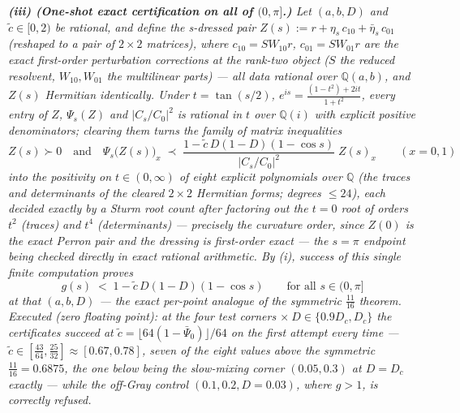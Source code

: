 \documentclass[
]{article}
\begin{document}
\emph{\textbf{(iii) (One-shot exact certification on all of $(0,\pi]$.)} Let
$(a,b,D)$ and $\tilde c\in[0,2)$ be rational, and define the \emph{s-dressed
pair} $Z(s):=r+\eta_s\,c_{10}+\bar\eta_s\,c_{01}$ (reshaped to a pair of
$2\times2$ matrices), where $c_{10}=SW_{10}r$, $c_{01}=SW_{01}r$ are the
exact first-order perturbation corrections at the rank-two object ($S$ the
reduced resolvent, $W_{10},W_{01}$ the multilinear parts) --- all data
rational over $\mathbb Q(a,b)$, and $Z(s)$ Hermitian identically. Under
$t=\tan(s/2)$, $e^{is}=\frac{(1-t^2)+2it}{1+t^2}$, every entry of $Z$,
$\Psi_s(Z)$ and $|C_s/C_0|^2$ is rational in $t$ over $\mathbb Q(i)$ with
explicit positive denominators; clearing them turns the family of matrix
inequalities}
\[
  Z(s)\succ0\quad\text{and}\quad
  \Psi_s\bigl(Z(s)\bigr)_x\;\prec\;
  \frac{1-\tilde c\,D(1-D)(1-\cos s)}{|C_s/C_0|^2}\;Z(s)_x\qquad(x=0,1)
\]
\emph{into the positivity on $t\in(0,\infty)$ of \emph{eight explicit
polynomials} over $\mathbb Q$ (the traces and determinants of the cleared
$2\times2$ Hermitian forms; degrees $\le24$), each decided exactly by a
Sturm root count after factoring out the $t=0$ root of orders $t^2$
(traces) and $t^4$ (determinants) --- precisely the curvature order, since
$Z(0)$ is the exact Perron pair and the dressing is first-order exact ---
the $s=\pi$ endpoint being checked directly in exact rational arithmetic.
By (i), success of this single finite computation \emph{proves}}
\[
  g(s)\;<\;1-\tilde c\,D(1-D)(1-\cos s)\qquad\text{for all }s\in(0,\pi]
\]
\emph{at that $(a,b,D)$ --- the exact per-point analogue of the symmetric
$\tfrac{11}{16}$ theorem. Executed (zero floating point): at the four test
corners $\times\ D\in\{0.9D_c,D_c\}$ the certificates succeed at
$\tilde c=\lfloor64(1-\bar\Psi_0)\rfloor/64$ on the first attempt every
time --- $\tilde c\in[\tfrac{43}{64},\tfrac{25}{32}]\approx[0.67,0.78]$,
seven of the eight values above the symmetric $\tfrac{11}{16}=0.6875$, the
one below being the slow-mixing corner $(0.05,0.3)$ at $D=D_c$ exactly ---
while the off-Gray control $(0.1,0.2,D=0.03)$, where $g>1$, is correctly
refused.}
\end{document}
